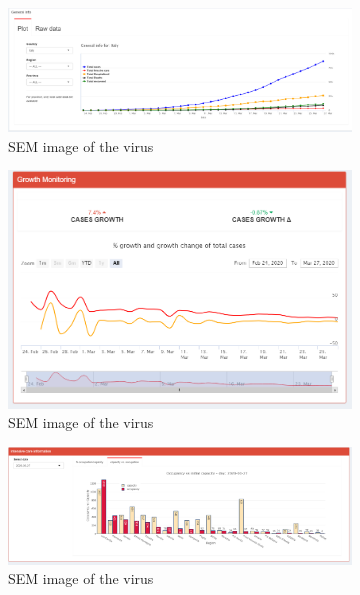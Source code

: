 \documentclass[
12pt, %
a4paper, %
oneside, %
headinclude,footinclude, %
BCOR5mm, %
]{scrartcl}
\begin{document}
\begin{figure}[H]
  \centering
\begin{subfigure}{0.8\textwidth}
  \centering
  \includegraphics[width=1\linewidth]{Figures/Inspection_general_info.png} 
  \caption{SEM image of the virus}
  \label{fig:Inspection_general_info}
\end{subfigure} 
\begin{subfigure}{0.8\textwidth}
  \centering
  \includegraphics[width=1\linewidth]{Figures/Inspection_growth_monitoring.png} 
  \caption{SEM image of the virus}
  \label{fig:Inspection_growth_monitoring}
\end{subfigure} 
\begin{subfigure}{0.8\textwidth}
  \centering
  \includegraphics[width=1\linewidth]{Figures/Inspection_occupancy2.png} 
  \caption{SEM image of the virus}
  \label{fig:Inspection_occupancy2}
\end{subfigure}\hspace{0.3\textwidth}
\caption{ }
\label{fig:Inspection_panels_2}
\end{figure}
\end{document}
